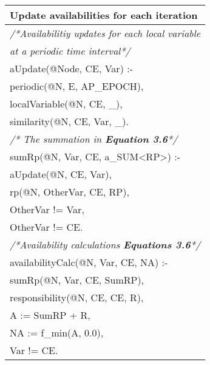 \documentclass[letterpaper,twocolumn,11pt]{article}
\begin{document}
\begin{tabular}{|l|}
\hline
\rowcolor{myblue} Update availabilities for each iteration\\
\hline
\scriptsize{\textit{/*Availabilitiy updates for each local variable}}\\
\scriptsize{\textit{at a periodic time interval*/}}\\
\scriptsize{aUpdate(@Node, CE, Var) :-}\\
\scriptsize{ \hspace{0.5cm}         periodic(@N, E, AP\_EPOCH),}\\
\scriptsize{ \hspace{0.5cm}         localVariable(@N, CE, \_),}\\
\scriptsize{ \hspace{0.5cm}         similarity(@N, CE, Var, \_).}\\

\scriptsize{\textit{/* The summation in \textbf{Equation 3.6}*/}}\\        
\scriptsize{sumRp(@N, Var, CE, a\_SUM\textless{}RP\textgreater{}) :-}\\
\scriptsize{ \hspace{0.5cm}         aUpdate(@N, CE, Var),}\\
\scriptsize{ \hspace{0.5cm}         rp(@N, OtherVar, CE, RP),}\\
\scriptsize{ \hspace{0.5cm}         OtherVar != Var,}\\
\scriptsize{ \hspace{0.5cm}         OtherVar != CE.}\\

\scriptsize{\textit{/*Availability calculations \textbf{Equations 3.6}*/}}\\
\scriptsize{availabilityCalc(@N, Var, CE, NA) :-}\\
\scriptsize{ \hspace{0.5cm}         sumRp(@N, Var, CE, SumRP),}\\
\scriptsize{ \hspace{0.5cm}         responsibility(@N, CE, CE, R),}\\
\scriptsize{ \hspace{0.5cm}         A := SumRP + R,}\\
\scriptsize{ \hspace{0.5cm}         NA := f\_min(A, 0.0),}\\
\scriptsize{ \hspace{0.5cm}         Var != CE.}\\


\end{tabular}
\end{document}
